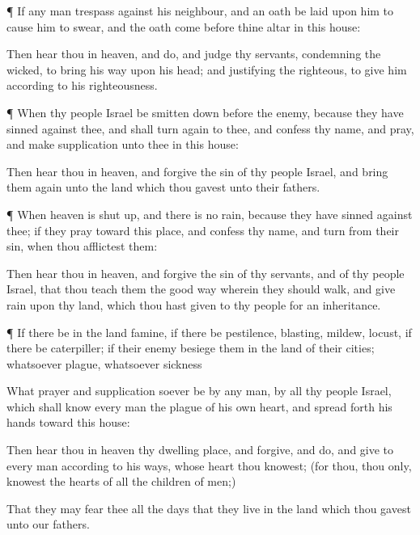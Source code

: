 {\par }{\PP {}¶ If any
man
trespass against his
neighbour, and an
oath be
laid upon him to cause him to
swear, and the
oath
come
before thine
altar in this
house:

Then
hear thou in
heaven, and
do, and
judge thy
servants,
condemning the
wicked, to
bring his
way upon his
head; and
justifying the
righteous, to
give him according to his
righteousness.


\par }{\PP {}¶ When thy
people
Israel be smitten
down
before the
enemy, because they have
sinned against thee, and shall turn
again to thee, and
confess thy
name, and
pray, and make
supplication unto thee in this
house:

Then
hear thou in
heaven, and
forgive the
sin of thy
people
Israel, and bring them
again unto the
land which thou
gavest unto their
fathers.


\par }{\PP {}¶ When
heaven is shut
up, and there is no
rain, because they have
sinned against thee; if they
pray toward this
place, and
confess thy
name, and
turn from their
sin, when thou
afflictest them:

Then
hear thou in
heaven, and
forgive the
sin of thy
servants, and of thy
people
Israel, that thou
teach them the
good
way wherein they should
walk, and
give
rain upon thy
land, which thou hast
given to thy
people for an
inheritance.


\par }{\PP {}¶ If there be in the
land
famine, if there be
pestilence,
blasting,
mildew,
locust,
{} if there be
caterpiller; if their
enemy
besiege them in the
land of their
cities; whatsoever
plague, whatsoever
sickness
{}

What
prayer and
supplication soever be
{} by any
man,
{} by all thy
people
Israel, which shall
know every
man the
plague of his own
heart, and spread
forth his
hands toward this
house:

Then
hear thou in
heaven thy
dwelling
place, and
forgive, and
do, and
give to every
man according to his
ways, whose
heart thou
knowest; (for thou,
{} thou only,
knowest the
hearts of all the
children of
men;)

That they may
fear thee all the
days that they
live
in the
land which thou
gavest unto our
fathers.

}

